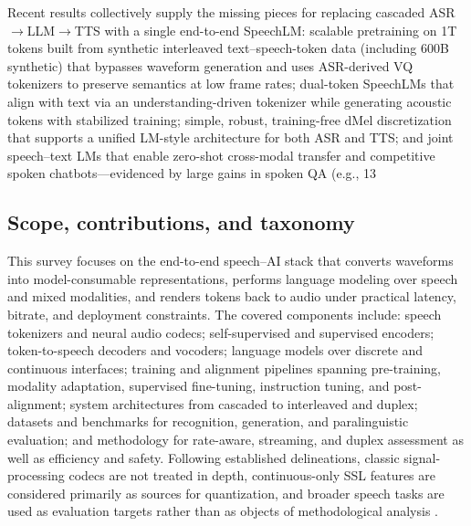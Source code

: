 \documentclass{article}
\begin{document}
Recent results collectively supply the missing pieces for replacing cascaded ASR$\rightarrow$LLM$\rightarrow$TTS with a single end-to-end SpeechLM: scalable pretraining on 1T tokens built from synthetic interleaved text--speech-token data (including 600B synthetic) that bypasses waveform generation and uses ASR-derived VQ tokenizers to preserve semantics at low frame rates; dual-token SpeechLMs that align with text via an understanding-driven tokenizer while generating acoustic tokens with stabilized training; simple, robust, training-free dMel discretization that supports a unified LM-style architecture for both ASR and TTS; and joint speech--text LMs that enable zero-shot cross-modal transfer and competitive spoken chatbots---evidenced by large gains in spoken QA (e.g., 13%



\subsection{Scope, contributions, and taxonomy} \label{subsec:Scope, contributions, and taxonomy}

This survey focuses on the end-to-end speech--AI stack that converts waveforms into model-consumable representations, performs language modeling over speech and mixed modalities, and renders tokens back to audio under practical latency, bitrate, and deployment constraints. The covered components include: speech tokenizers and neural audio codecs; self-supervised and supervised encoders; token-to-speech decoders and vocoders; language models over discrete and continuous interfaces; training and alignment pipelines spanning pre-training, modality adaptation, supervised fine-tuning, instruction tuning, and post-alignment; system architectures from cascaded to interleaved and duplex; datasets and benchmarks for recognition, generation, and paralinguistic evaluation; and methodology for rate-aware, streaming, and duplex assessment as well as efficiency and safety. Following established delineations, classic signal-processing codecs are not treated in depth, continuous-only SSL features are considered primarily as sources for quantization, and broader speech tasks are used as evaluation targets rather than as objects of methodological analysis \cite{guo2025recentadvancesdiscretespeechtokensreview}.
\end{document}
